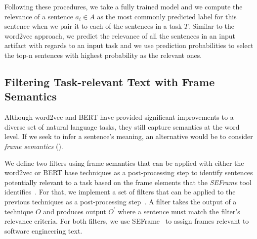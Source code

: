 Following these procedures, we take a fully trained model and we compute the relevance of a sentence $a_i \in A$ as the most commonly predicted label for this sentence when we pair it to each of the sentences in a task $T$.
Similar to the word2vec approach, we predict the relevance of all the sentences in an input artifact with regards to an input task and we use prediction probabilities to select 
the top-n sentences with highest probability as the relevant ones.









\subsection{Filtering Task-relevant Text with Frame Semantics}
\label{cp5:approach-filters}




Although word2vec and BERT have provided significant improvements to a diverse set of natural language tasks, 
they still capture semantics at the word level. 
If we seek to infer a sentence's meaning, an alternative would be to consider  \textit{frame semantics} ().


We define two filters using frame semantics that can be
applied with either the word2vec or BERT base techniques as
 a post-processing step to identify sentences potentially relevant to a task based on the frame elements that the \textit{SEFrame} tool identifies~\cite{marques2020}.
For that, we implement a set of filters that can be applied to the previous techniques as a post-processing step~\cite{Manning2009IR}.
A filter takes the output of a technique $O$ and produces output $O^{\prime}$ where a sentence must match the filter's relevance criteria. For both filters, we use SEFrame~\cite{marques2021} to assign frames relevant to
software engineering text.





